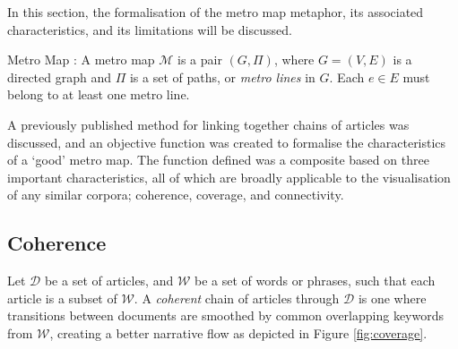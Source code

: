 In this section, the formalisation of the metro map metaphor, its associated characteristics, and its limitations will be discussed.

\begin{definition}{Metro Map \citep{GeneratingInformationMaps}:}
A metro map $\mathcal{M}$ is a pair $(G, \Pi)$, where $G=(V, E)$ is a directed graph and $\Pi$ is a set of paths, or \textit{metro lines} in $G$. Each $e \in E$ must belong to at least one metro line.
\end{definition}

A previously published method \citep{ConnectingTheDots} for linking together chains of articles  was discussed, and an objective function was created to formalise the characteristics of a `good' metro map. The function defined was a composite based on three important characteristics, all of which are broadly applicable to the visualisation of any similar corpora; coherence, coverage, and connectivity.

\subsection{Coherence}
Let $\mathcal{D}$ be a set of articles, and $\mathcal{W}$ be a set of words or phrases, such that each article is a subset of $\mathcal{W}$. A \textit{coherent} chain of articles through $\mathcal{D}$ is one where transitions between documents are smoothed by common overlapping keywords from $\mathcal{W}$, creating a better narrative flow \citep{ConnectingTheDots} as depicted in Figure \ref{fig:coverage}.

